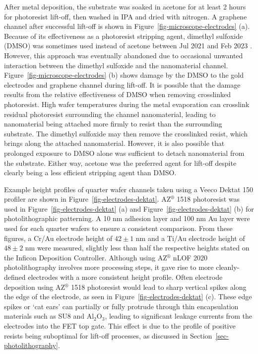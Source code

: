\documentclass[
  a4paper,
]{scrbook}
\begin{document}
After metal deposition, the substrate was soaked in acetone for at least
2 hours for photoresist lift-off, then washed in IPA and dried with
nitrogen. A graphene channel after successful lift-off is shown in
Figure~\ref{fig-microscope-electrodes} (a). Because of its effectiveness
as a photoresist stripping agent, dimethyl sulfoxide (DMSO) was
sometimes used instead of acetone between Jul 2021 and Feb 2023
\autocite{Microchemicals2}. However, this approach was eventually
abandoned due to occasional unwanted interaction between the dimethyl
sulfoxide and the nanomaterial channel.
Figure~\ref{fig-microscope-electrodes} (b) shows damage by the DMSO to
the gold electrodes and graphene channel during lift-off. It is possible
that the damage results from the relative effectiveness of DMSO when
removing crosslinked photoresist. High wafer temperatures during the
metal evaporation can crosslink residual photoresist surrounding the
channel nanomaterial, leading to nanomaterial being attached more firmly
to resist than the surrounding substrate. The dimethyl sulfoxide may
then remove the crosslinked resist, which brings along the attached
nanomaterial. However, it is also possible that prolonged exposure to
DMSO alone was sufficient to detach nanomaterial from the substrate.
Either way, acetone was the preferred agent for lift-off despite clearly
being a less efficient stripping agent than DMSO.

Example height profiles of quarter wafer channels taken using a Veeco
Dektat 150 profiler are shown in Figure~\ref{fig-electrodes-dektat}.
AZ\(^\circledR\) 1518 photoresist was used in
Figure~\ref{fig-electrodes-dektat} (a) and
Figure~\ref{fig-electrodes-dektat} (b) for photolithographic patterning.
A 10 nm adhesion layer and 100 nm Au layer were used for each quarter
wafers to ensure a consistent comparison. From these figures, a Cr/Au
electrode height of \(42\pm1\) nm and a Ti/Au electrode height of
\(48\pm2\) nm were measured, slightly less than half the respective
heights stated on the Inficon Deposition Controller. Although using
AZ\(^\circledR\) nLOF 2020 photolithography involves more processing
steps, it gave rise to more cleanly-defined electrodes with a more
consistent height profile. Often electrode deposition using
AZ\(^\circledR\) 1518 photoresist would lead to sharp vertical spikes
along the edge of the electrode, as seen in
Figure~\ref{fig-electrodes-dektat} (c). These edge spikes or `cat ears'
can partially or fully protrude through thin encapsulation materials
such as SU8 and Al\(_2\)O\(_3\), leading to significant leakage currents
from the electrodes into the FET top gate. This effect is due to the
profile of positive resists being suboptimal for lift-off processes, as
discussed in Section~\ref{sec-photolithography}.
\end{document}
